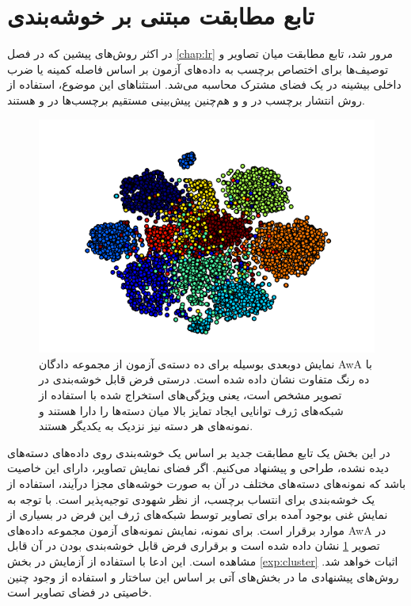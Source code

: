 \section{ تابع مطابقت مبتنی بر خوشه‌بندی }\label{compatibility_function}
در اکثر روش‌های پیشین که در فصل \ref{chap:lr} مرور شد، تابع مطابقت میان تصاویر و توصیف‌ها برای اختصاص برچسب به داده‌های آزمون بر اساس فاصله کمینه یا ضرب داخلی بیشینه در یک فضای مشترک محاسبه می‌شد. استثناهای این موضوع، استفاده از روش انتشار برچسب در \cite{Fu2014} و \cite{Kodirov2015} و هم‌چنین پیش‌بینی مستقیم برچسب‌ها در
\cite{li15max}
و
\cite{semi15}
هستند.

\begin{figure}[!t]
\centering
\includegraphics[width=0.85\linewidth]{images/awa_clusters}
\caption[نمایش دسته‌های آزمون مجموعه دادگان AwA ]{
نمایش دوبعدی بوسیله  برای ده دسته‌ی آزمون از مجموعه دادگان AwA با ده رنگ متفاوت نشان داده شده است. درستی فرض قابل خوشه‌بندی در تصویر مشخص است، یعنی ویژگی‌های استخراج شده با استفاده از شبکه‌های ژرف توانایی ایجاد تمایز بالا میان دسته‌ها را دارا هستند و نمونه‌های هر دسته نیز نزدیک به یکدیگر هستند.
}
\label{fig:awa_clusters}
\end{figure}

در این بخش  یک تابع مطابقت جدید بر اساس یک خوشه‌بندی روی داده‌های دسته‌های دیده نشده، طراحی و پیشنهاد می‌کنیم. اگر فضای نمایش تصاویر، دارای این خاصیت باشد که نمونه‌های دسته‌های مختلف در آن به صورت خوشه‌های مجزا درآیند، استفاده از یک خوشه‌بندی برای انتساب برچسب، از نظر شهودی توجیه‌پذیر است.
با توجه به نمایش غنی بوجود آمده برای تصاویر توسط شبکه‌های ژرف این فرض در بسیاری از موارد برقرار است. برای نمونه، نمایش  نمونه‌های آزمون مجموعه داده‌های AwA در تصویر
\ref{fig:awa_clusters}
نشان داده شده است و برقراری فرض قابل خوشه‌بندی بودن در آن قابل مشاهده است. این ادعا با استفاده از آزمایش در بخش
\ref{exp:cluster}
اثبات خواهد شد. روش‌های پیشنهادی ما در بخش‌های آتی بر اساس این ساختار و استفاده از وجود چنین خاصیتی در فضای تصاویر است.

